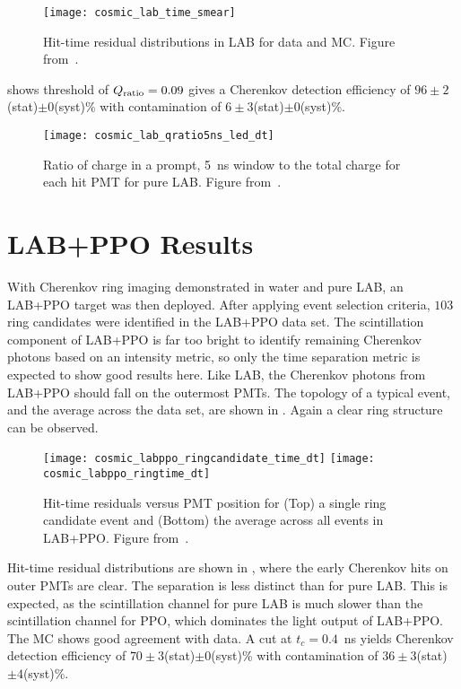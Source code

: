 \begin{figure}
	\centering
	\texttt{[image: cosmic\_lab\_time\_smear]}
	\caption{Hit-time residual distributions in LAB for data and MC. Figure from~\cite{chess_lab}.}
	\label{fig:lab}
\end{figure}

 shows threshold of $Q_{\rm ratio}=0.09$ gives a Cherenkov detection efficiency of $96\pm2$(stat)$\pm0$(syst)\% with contamination of $6\pm3$(stat)$\pm0$(syst)\%.

\begin{figure}
	\centering
	\texttt{[image: cosmic\_lab\_qratio5ns\_led\_dt]}
	\caption{Ratio of charge in a prompt, 5~ns window to the total charge for each hit PMT  for pure LAB. Figure from~\cite{chess_lab}.}
	\label{f:labQ}
\end{figure}

\clearpage

\section{LAB+PPO Results}
\label{sec:labppo}

With Cherenkov ring imaging demonstrated in water and pure LAB, an LAB+PPO target was then deployed.
After applying event selection criteria, $103$ ring candidates were identified in the LAB+PPO data set. 
The scintillation component of LAB+PPO is far too bright to identify remaining Cherenkov photons based on an intensity metric, so only the time separation metric is expected to show good results here.
Like LAB, the Cherenkov photons from LAB+PPO should fall on the outermost PMTs.
The topology of a typical event, and the average across the data set, are shown in .  Again a clear ring structure can be observed. 
\begin{figure}
	\centering
	\texttt{[image: cosmic\_labppo\_ringcandidate\_time\_dt]}
	\texttt{[image: cosmic\_labppo\_ringtime\_dt]}	
	\caption{Hit-time residuals versus PMT position for (Top) a single ring candidate event and (Bottom) the average across all events in LAB+PPO. Figure from~\cite{chess_lab}.}
	\label{fig:labppo_ring}
\end{figure}
Hit-time residual distributions are shown in , where the early Cherenkov hits on outer PMTs are clear. 
The separation is less distinct than for pure LAB.
This is expected, as the scintillation channel for pure LAB is much slower than the scintillation channel for PPO, which dominates the light output of LAB+PPO.
The MC shows good agreement with data.  
A cut at $ t_c = 0.4$~ns yields Cherenkov detection efficiency of $70 \pm 3 $(stat)$\pm0$(syst)\% with contamination of $36 \pm 3 $(stat)$\pm4$(syst)\%. 

